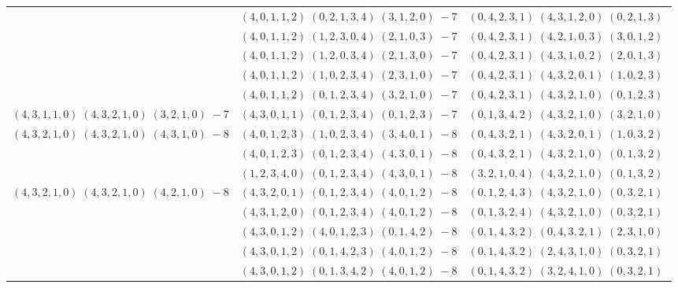 \documentclass[11pt]{article}
\begin{document}
\begin{longtable}[l]{|c|c|c|}
 \cline{2-3} 
 & $(4 ,0 ,1 ,1 ,2) \;(0 ,2 ,1 ,3 ,4) \;(3 ,1 ,2 ,0) \;-7$ & $(0 ,4 ,2 ,3 ,1) \;(4 ,3 ,1 ,2 ,0) \;(0 ,2 ,1 ,3) \;$\\ 
 \cline{2-3} 
 & $(4 ,0 ,1 ,1 ,2) \;(1 ,2 ,3 ,0 ,4) \;(2 ,1 ,0 ,3) \;-7$ & $(0 ,4 ,2 ,3 ,1) \;(4 ,2 ,1 ,0 ,3) \;(3 ,0 ,1 ,2) \;$\\ 
 \cline{2-3} 
 & $(4 ,0 ,1 ,1 ,2) \;(1 ,2 ,0 ,3 ,4) \;(2 ,1 ,3 ,0) \;-7$ & $(0 ,4 ,2 ,3 ,1) \;(4 ,3 ,1 ,0 ,2) \;(2 ,0 ,1 ,3) \;$\\ 
 \cline{2-3} 
 & $(4 ,0 ,1 ,1 ,2) \;(1 ,0 ,2 ,3 ,4) \;(2 ,3 ,1 ,0) \;-7$ & $(0 ,4 ,2 ,3 ,1) \;(4 ,3 ,2 ,0 ,1) \;(1 ,0 ,2 ,3) \;$\\ 
 \cline{2-3} 
 & $(4 ,0 ,1 ,1 ,2) \;(0 ,1 ,2 ,3 ,4) \;(3 ,2 ,1 ,0) \;-7$ & $(0 ,4 ,2 ,3 ,1) \;(4 ,3 ,2 ,1 ,0) \;(0 ,1 ,2 ,3) \;$\\ \hline\multirow[t]{1}{*}{ $(4 ,3 ,1 ,1 ,0) \;(4 ,3 ,2 ,1 ,0) \;(3 ,2 ,1 ,0) \;-7$ }  & $(4 ,3 ,0 ,1 ,1) \;(0 ,1 ,2 ,3 ,4) \;(0 ,1 ,2 ,3) \;-7$ & $(0 ,1 ,3 ,4 ,2) \;(4 ,3 ,2 ,1 ,0) \;(3 ,2 ,1 ,0) \;$\\ \hline\multirow[t]{3}{*}{ $(4 ,3 ,2 ,1 ,0) \;(4 ,3 ,2 ,1 ,0) \;(4 ,3 ,1 ,0) \;-8$ }  & $(4 ,0 ,1 ,2 ,3) \;(1 ,0 ,2 ,3 ,4) \;(3 ,4 ,0 ,1) \;-8$ & $(0 ,4 ,3 ,2 ,1) \;(4 ,3 ,2 ,0 ,1) \;(1 ,0 ,3 ,2) \;$\\ 
 \cline{2-3} 
 & $(4 ,0 ,1 ,2 ,3) \;(0 ,1 ,2 ,3 ,4) \;(4 ,3 ,0 ,1) \;-8$ & $(0 ,4 ,3 ,2 ,1) \;(4 ,3 ,2 ,1 ,0) \;(0 ,1 ,3 ,2) \;$\\ 
 \cline{2-3} 
 & $(1 ,2 ,3 ,4 ,0) \;(0 ,1 ,2 ,3 ,4) \;(4 ,3 ,0 ,1) \;-8$ & $(3 ,2 ,1 ,0 ,4) \;(4 ,3 ,2 ,1 ,0) \;(0 ,1 ,3 ,2) \;$\\ \hline\multirow[t]{89}{*}{ $(4 ,3 ,2 ,1 ,0) \;(4 ,3 ,2 ,1 ,0) \;(4 ,2 ,1 ,0) \;-8$ }  & $(4 ,3 ,2 ,0 ,1) \;(0 ,1 ,2 ,3 ,4) \;(4 ,0 ,1 ,2) \;-8$ & $(0 ,1 ,2 ,4 ,3) \;(4 ,3 ,2 ,1 ,0) \;(0 ,3 ,2 ,1) \;$\\ 
 \cline{2-3} 
 & $(4 ,3 ,1 ,2 ,0) \;(0 ,1 ,2 ,3 ,4) \;(4 ,0 ,1 ,2) \;-8$ & $(0 ,1 ,3 ,2 ,4) \;(4 ,3 ,2 ,1 ,0) \;(0 ,3 ,2 ,1) \;$\\ 
 \cline{2-3} 
 & $(4 ,3 ,0 ,1 ,2) \;(4 ,0 ,1 ,2 ,3) \;(0 ,1 ,4 ,2) \;-8$ & $(0 ,1 ,4 ,3 ,2) \;(0 ,4 ,3 ,2 ,1) \;(2 ,3 ,1 ,0) \;$\\ 
 \cline{2-3} 
 & $(4 ,3 ,0 ,1 ,2) \;(0 ,1 ,4 ,2 ,3) \;(4 ,0 ,1 ,2) \;-8$ & $(0 ,1 ,4 ,3 ,2) \;(2 ,4 ,3 ,1 ,0) \;(0 ,3 ,2 ,1) \;$\\ 
 \cline{2-3} 
 & $(4 ,3 ,0 ,1 ,2) \;(0 ,1 ,3 ,4 ,2) \;(4 ,0 ,1 ,2) \;-8$ & $(0 ,1 ,4 ,3 ,2) \;(3 ,2 ,4 ,1 ,0) \;(0 ,3 ,2 ,1) \;$\\ 

\end{longtable}
\end{document}
